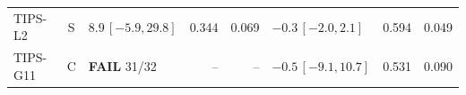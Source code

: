 \begin{longtable}{lcp{37mm}rrp{37mm}rr}
TIPS-L2 & S & \(8.9\,[-5.9,29.8]\) & 0.344 & 0.069 & \(-0.3\,[-2.0,2.1]\) & 0.594 & 0.049\\
TIPS-G11 & C & \textbf{FAIL} 31/32 & -- & -- & \(-0.5\,[-9.1,10.7]\) & 0.531 & 0.090\\

\end{longtable}
